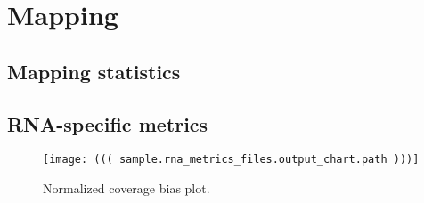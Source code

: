 \section{Mapping}
\label{sec:map-((( sample.name )))}

\subsection{Mapping statistics}

\indent


\subsection{RNA-specific metrics}

{
    \begin{figure}[h!]
        \centering
        \texttt{[image: ((( sample.rna\_metrics\_files.output\_chart.path )))]}
        \caption{Normalized coverage bias plot.}
    \end{figure}
}

